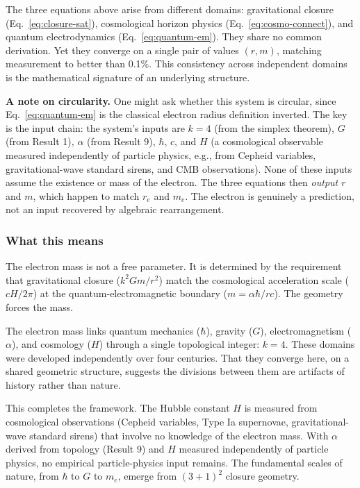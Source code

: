 \documentclass[aps,prd,preprint,superscriptaddress,showpacs,preprintnumbers,amsmath,amssymb,nofootinbib]{revtex4-2}
\begin{document}
The three equations above arise from different domains: gravitational closure (Eq.~\ref{eq:closure-sat}), cosmological horizon physics (Eq.~\ref{eq:cosmo-connect}), and quantum electrodynamics (Eq.~\ref{eq:quantum-em}). They share no common derivation. Yet they converge on a single pair of values $(r, m)$, matching measurement to better than 0.1\%. This consistency across independent domains is the mathematical signature of an underlying structure.

\textbf{A note on circularity.} One might ask whether this system is circular, since Eq.~\ref{eq:quantum-em} is the classical electron radius definition inverted. The key is the input chain: the system's inputs are $k = 4$ (from the simplex theorem), $G$ (from Result 1), $\alpha$ (from Result 9), $\hbar$, $c$, and $H$ (a cosmological observable measured independently of particle physics, e.g., from Cepheid variables, gravitational-wave standard sirens, and CMB observations). None of these inputs assume the existence or mass of the electron. The three equations then \emph{output} $r$ and $m$, which happen to match $r_e$ and $m_e$. The electron is genuinely a prediction, not an input recovered by algebraic rearrangement.

\subsubsection*{What this means}

The electron mass is not a free parameter. It is determined by the requirement that gravitational closure ($k^2 G m/r^2$) match the cosmological acceleration scale ($cH/2\pi$) at the quantum-electromagnetic boundary ($m = \alpha\hbar/rc$). The geometry forces the mass.

The electron mass links quantum mechanics ($\hbar$), gravity ($G$), electromagnetism ($\alpha$), and cosmology ($H$) through a single topological integer: $k = 4$. These domains were developed independently over four centuries. That they converge here, on a shared geometric structure, suggests the divisions between them are artifacts of history rather than nature.

This completes the framework. The Hubble constant $H$ is measured from cosmological observations (Cepheid variables, Type Ia supernovae, gravitational-wave standard sirens) that involve no knowledge of the electron mass. With $\alpha$ derived from topology (Result 9) and $H$ measured independently of particle physics, no empirical particle-physics input remains. The fundamental scales of nature, from $\hbar$ to $G$ to $m_e$, emerge from $(3+1)^2$ closure geometry.
\end{document}
